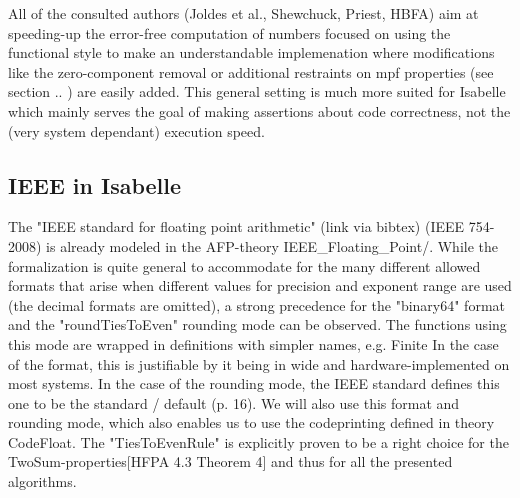 \documentclass[11pt,a4paper]{article}
\begin{document}
All of the consulted authors (Joldes et al., Shewchuck, Priest, HBFA) aim at speeding-up the error-free computation of numbers
focused on using the functional style to make an understandable implemenation where modifications like the zero-component removal or additional restraints on mpf properties (see section .. ) are easily added.
This general setting is much more suited for Isabelle which mainly serves the goal of making assertions about code correctness, not the (very system dependant) execution speed.

\subsection{IEEE in Isabelle}

The "IEEE standard for floating point arithmetic" (link via bibtex) (IEEE 754-2008) is already modeled in the AFP-theory IEEE\_Floating\_Point/\IEEE.
While the formalization is quite general to accommodate for the many different allowed formats that arise when different values for precision and exponent range are used (the decimal formats are omitted), a strong precedence for the "binary64" format and the "roundTiesToEven" rounding mode can be observed. The functions using this mode are wrapped in definitions with simpler names, e.g. Finite
In the case of the format, this is justifiable by it being in wide and hardware-implemented on most systems.
In the case of the rounding mode, the IEEE standard defines this one to be the standard / default (p. 16).
We will also use this format and rounding mode, which also enables us to use the codeprinting defined in theory CodeFloat. The "TiesToEvenRule" is explicitly proven to be a right choice for the TwoSum-properties[HFPA 4.3 Theorem 4] and thus for all the presented algorithms.
\end{document}
